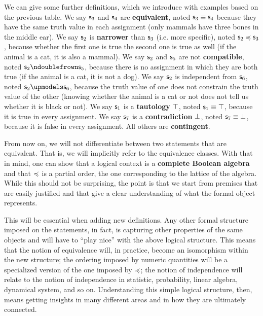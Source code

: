 \documentclass[letterpaper]{article}
\begin{document}
We can give some further definitions, which we introduce with examples based on the previous table. We say $\mathsf{s}_3$ and $\mathsf{s}_4$ are \textbf{equivalent}, noted $\mathsf{s}_3 \equiv \mathsf{s}_4$ because they have the same truth value in each assignment (only mammals have three bones in the middle ear). We say $\mathsf{s}_2$ is \textbf{narrower} than $\mathsf{s}_3$ (i.e. more specific), noted $\mathsf{s}_2 \preccurlyeq \mathsf{s}_3$, because whether the first one is true the second one is true as well (if the animal is a cat, it is also a mammal). We say $\mathsf{s}_2$ and $\mathsf{s}_5$ are not \textbf{compatible}, noted $\stmt_2 \ncomp \stmt_5$, because there is no assignment in which they are both true (if the animal is a cat, it is not a dog). We say $\mathsf{s}_2$ is independent from $\mathsf{s}_6$, noted $\stmt_2 \indep \stmt_6$, because the truth value of one does not constrain the truth value of the other (knowing whether the animal is a cat or not does not tell us whether it is black or not). We say $\mathsf{s}_1$ is a \textbf{tautology} $\top$, noted $\mathsf{s}_1 \equiv \top$, because it is true in every assignment. We say $\mathsf{s}_7$ is a \textbf{contradiction} $\bot$, noted $\mathsf{s}_7 \equiv \bot$, because it is false in every assignment. All others are \textbf{contingent}.

From now on, we will not differentiate between two statements that are equivalent. That is, we will implicitly refer to the equivalence classes. With that in mind, one can show that a logical context is a \textbf{complete Boolean algebra} and that $\preccurlyeq$ is a partial order, the one corresponding to the lattice of the algebra. While this should not be surprising, the point is that we start from premises that are easily justified and that give a clear understanding of what the formal object represents.

This will be essential when adding new definitions. Any other formal structure imposed on the statements, in fact, is capturing other properties of the same objects and will have to ``play nice'' with the above logical structure. This means that the notion of equivalence will, in practice, become an isomorphism within the new structure; the ordering imposed by numeric quantities will be a specialized version of the one imposed by $\preccurlyeq$; the notion of independence will relate to the notion of independence in statistic, probability, linear algebra, dynamical system, and so on. Understanding this simple logical structure, then, means getting insights in many different areas and in how they are ultimately connected.
\end{document}
